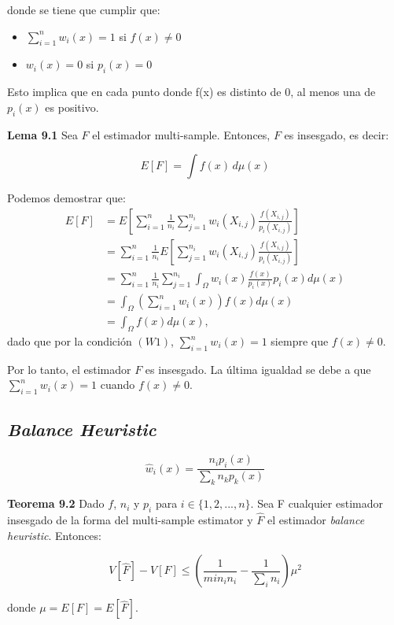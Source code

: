 \documentclass{article}
\begin{document}
donde se tiene que cumplir que:

\begin{itemize}
    \item $\sum_{i=1}^{n} w_{i}(x) = 1$ si $f(x) \neq 0$
    \item $w_{i}(x) = 0$ si $p_{i}(x) = 0$
\end{itemize}

Esto implica que en cada punto donde f(x) es distinto de 0, al menos una de $p_{i}(x)$ es positivo.

\textbf{Lema 9.1} Sea $F$ el estimador multi-sample. Entonces, $F$ es insesgado, es decir:

$$E[F] = \int f(x) \,d\mu(x)$$

Podemos demostrar que:
\begin{align*}
E[F] &= E\left[\sum_{i=1}^n \frac{1}{n_i} \sum_{j=1}^{n_i} w_i(X_{i,j}) \frac{f(X_{i,j})}{p_i(X_{i,j})}\right] \\
&= \sum_{i=1}^n \frac{1}{n_i} E\left[\sum_{j=1}^{n_i} w_i(X_{i,j}) \frac{f(X_{i,j})}{p_i(X_{i,j})}\right] \\
&= \sum_{i=1}^n \frac{1}{n_i} \sum_{j=1}^{n_i} \int_{\Omega} w_i(x) \frac{f(x)}{p_i(x)} p_i(x) d\mu(x) \\
&= \int_{\Omega} \left(\sum_{i=1}^n w_i(x)\right) f(x) d\mu(x) \\
&= \int_{\Omega} f(x) d\mu(x),
\end{align*}
dado que por la condición \( (W1) \), \( \sum_{i=1}^n w_i(x) = 1 \) siempre que \( f(x) \neq 0 \).

Por lo tanto, el estimador \( F \) es insesgado. La última igualdad se debe a que \( \sum_{i=1}^n w_i(x) = 1 \) cuando \( f(x) \neq 0 \).

\subsection{\textit{Balance Heuristic}}

$$ \hat{w}_{i}(x) = \frac{n_{i} p_{i}(x)}{\sum_{k} n_{k} p_{k}(x)}$$

\textbf{Teorema 9.2} Dado $f$, $n_{i}$ y $p_{i}$ para $i \in \{1, 2, ..., n\}$. Sea F cualquier estimador insesgado de la forma del multi-sample estimator y $\hat{F}$ el estimador \textit{balance heuristic}. Entonces:

$$V[\hat{F}] - V[F] \leq ( \frac{1}{min_{i} n_{i}} - \frac{1}{\sum_{i} n_{i}} ) \mu^{2}$$

donde $\mu = E[F] = E[\hat{F}]$.
\end{document}
